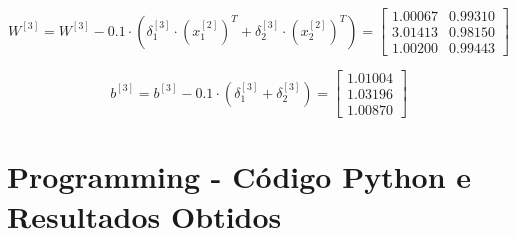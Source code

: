 \documentclass[a4paper,12pt]{article} %
\begin{document}
\begin{enumerate}
\begin{equation*}
    W^{[3]} = W^{[3]} - 0.1 \cdot (\delta^{[3]}_1 \cdot (x^{[2]}_1)^T + \delta^{[3]}_2 \cdot (x^{[2]}_2)^T) = \begin{bmatrix} 1.00067 & 0.99310 \\
                                                                                                                            3.01413 & 0.98150 \\
                                                                                                                            1.00200 & 0.99443 \end{bmatrix}
\end{equation*}

\begin{equation*}
    b^{[3]} = b^{[3]} - 0.1 \cdot (\delta^{[3]}_1 + \delta^{[3]}_2) = \begin{bmatrix} 1.01004 \\ 1.03196 \\ 1.00870 \end{bmatrix}
\end{equation*}

\end{enumerate}

\clearpage
\section*{Programming - Código Python e Resultados Obtidos}
\end{document}
